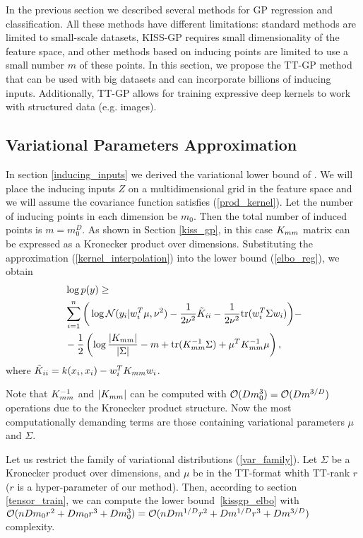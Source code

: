 In the previous section we described several methods for GP regression and
classification. All these methods have different limitations: standard methods
are limited to small-scale datasets, KISS-GP requires small dimensionality of
the feature space, and other methods based on inducing points are limited to use
a small number $m$ of these points. In this section, we propose the TT-GP method
that can be used with big datasets and can incorporate billions of inducing
inputs. Additionally, TT-GP allows for training expressive deep kernels to work
with structured data (e.g. images).

\subsection{Variational Parameters Approximation}
  In section \ref{inducing_inputs} we derived the variational lower bound of
  \citet{hensman2013}. We will place the inducing inputs $Z$ on a
  multidimensional grid in the feature space and we will assume the
  covariance function satisfies (\ref{prod_kernel}). Let the number
  of inducing points in each dimension be $m_0$. Then the total number of induced points is $m = m_0^D$.
  As shown in Section \ref{kiss_gp},
  in this case $K_{mm}$ matrix can be expressed as a Kronecker product over
  dimensions. Substituting the approximation (\ref{kernel_interpolation}) into
  the lower bound (\ref{elbo_reg}), we obtain
  \begin{equation}
  \label{kissgp_elbo}
    \begin{split}
      &\log p(y) \ge
        \\
        &\sum_{i=1}^n \bigg ( \log \mathcal{N} (y_i | w_i^T \mu, \nu^2) -
        \frac 1 {2\nu^2} \tilde K_{ii} - 
        \frac 1 {2\nu^2} \mbox{tr} (w_i^T \Sigma w_i)
      \bigg )-
      \\
      &- \frac 1 2 \left(
        \log \frac {|K_{mm}|} {|\Sigma|} - m + \mbox{tr}(K_{mm}^{-1} \Sigma) +
        \mu^T K_{mm}^{-1} \mu
      \right),
    \end{split}
  \end{equation}
  where $\tilde K_{ii} = k(x_i, x_i) - w_i^T K_{mm} w_i$.

  Note that $K_{mm}^{-1}$ and $|K_{mm}|$ can be computed with
  $\mathcal{O}(D m_0^3) = \mathcal{O}(D m^{3/D})$ operations due to the
  Kronecker product structure. Now the most computationally demanding terms
  are those containing variational parameters $\mu$ and $\Sigma$.

  Let us restrict the family of variational distributions (\ref{var_family}). Let $\Sigma$ be
  a Kronecker product over dimensions, and $\mu$ be in the TT-format whith 
  TT-rank $r$ ($r$ is a hyper-parameter of our method). Then, according to 
  section \ref{tensor_train}, we can compute the lower bound~\eqref{kissgp_elbo}
  with
  $\mathcal{O}(nDm_0 r^2 + D m_0 r^3 + Dm_0^3) =
  \mathcal{O}(nD m^{1/D} r^2 + D m^{1/D} r^3 + D m^{3/D})$ complexity.

